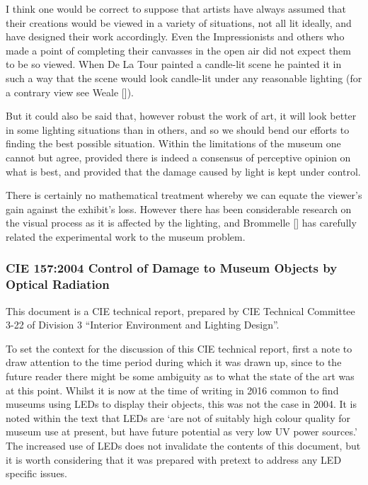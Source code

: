 \begin{itquote}{}
I think one would be correct to suppose that artists have always assumed that their creations would be viewed in a variety of situations, not all lit ideally, and have designed their work accordingly. Even the Impressionists and others who made a point of completing their canvasses in the open air did not expect them to be so viewed. When De La Tour painted a candle-lit scene he painted it in such a way that the scene would look candle-lit under any reasonable lighting (for a contrary view see Weale [\citep{weale_truth_1973}]). 

But it could also be said that, however robust the work of art, it will look better in some lighting situations than in others, and so we should bend our efforts to finding the best possible situation. Within the limitations of the museum one cannot but agree, provided there is indeed a consensus of perceptive opinion on what is best, and provided that the damage caused by light is kept under control. 

There is certainly no mathematical treatment whereby we can equate the viewer's gain against the exhibit's loss. However there has been considerable research on the visual process as it is affected by the lighting, and Brommelle [\citep{brommelle_visual_1972}] has carefully related the experimental work to the museum problem.
\end{itquote}

\subsubsection{\gls{CIE} 157:2004 Control of Damage to Museum Objects by Optical Radiation}

This document is a \gls{CIE} technical report, prepared by \gls{CIE} Technical Committee 3-22 of Division 3 ``Interior Environment and Lighting Design''. 

To set the context for the discussion of this \gls{CIE} technical report, first a note to draw attention to the time period during which it was drawn up, since to the future reader there might be some ambiguity as to what the state of the art was at this point. Whilst it is now at the time of writing in 2016 common to find museums using LEDs to display their objects, this was not the case in 2004. It is noted within the text that LEDs are `are not of suitably high colour quality for museum use at present, but have future potential as very low UV power sources.' The increased use of LEDs does not invalidate the contents of this document, but it is worth considering that it was prepared with pretext to address any LED specific issues.

